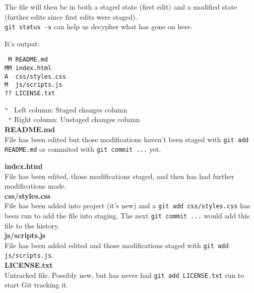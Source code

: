 The file will then be in both a staged state (first edit) and a modified state (further edits since first edits were staged).
\\

\texttt{git status -s} can help us decypher what has gone on here.

It's output:

\begin{verbatim}
 M README.md
MM index.html
A  css/styles.css
M  js/scripts.js
?? LICENSE.txt
\end{verbatim}

\texttt{⌃ } Left column: Staged changes column
\\
\texttt{ ⌃} Right column: Unstaged changes column
\\

\textbf{README.md}
\\
File has been edited but those modifications haven't been staged with \texttt{git add README.md} or commited with \texttt{git commit ...} yet.


\textbf{index.html}
\\
File has been edited, those modifications staged, and then has had further modifications made.
\\

\textbf{css/styles.css}
\\
File has been added into project (it's new) and a \texttt{git add css/styles.css} has been run to add the file into staging. The next \texttt{git commit ...} would add this file to the history.
\\

\textbf{js/scripts.js}
\\
File has been added edited and those modifications staged with \texttt{git add js/scripts.js}.
\\

\textbf{LICENSE.txt}
\\
Untracked file. Possibly new, but has never had \texttt{git add LICENSE.txt} run to start Git tracking it.
\\
